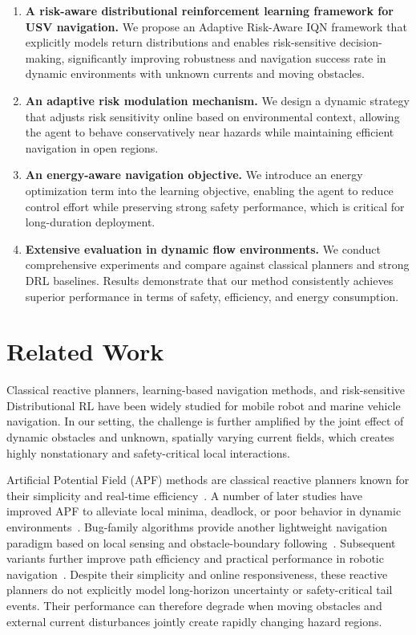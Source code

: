 \documentclass[runningheads]{llncs}
\begin{document}
\begin{enumerate}

\item \textbf{A risk-aware distributional reinforcement learning framework for USV navigation.}
We propose an Adaptive Risk-Aware IQN framework that explicitly models return distributions and enables risk-sensitive decision-making, significantly improving robustness and navigation success rate in dynamic environments with unknown currents and moving obstacles.

\item \textbf{An adaptive risk modulation mechanism.}
We design a dynamic strategy that adjusts risk sensitivity online based on environmental context, allowing the agent to behave conservatively near hazards while maintaining efficient navigation in open regions.

\item \textbf{An energy-aware navigation objective.}
We introduce an energy optimization term into the learning objective, enabling the agent to reduce control effort while preserving strong safety performance, which is critical for long-duration deployment.

\item \textbf{Extensive evaluation in dynamic flow environments.}
We conduct comprehensive experiments and compare against classical planners and strong DRL baselines. Results demonstrate that our method consistently achieves superior performance in terms of safety, efficiency, and energy consumption.

\end{enumerate}
\section{Related Work}
Classical reactive planners, learning-based navigation methods, and risk-sensitive Distributional RL have been widely studied for mobile robot and marine vehicle navigation. In our setting, the challenge is further amplified by the joint effect of dynamic obstacles and unknown, spatially varying current fields, which creates highly nonstationary and safety-critical local interactions.

Artificial Potential Field (APF) methods are classical reactive planners known for their simplicity and real-time efficiency~\cite{ref13}. A number of later studies have improved APF to alleviate local minima, deadlock, or poor behavior in dynamic environments~\cite{ref16,ref17}. Bug-family algorithms provide another lightweight navigation paradigm based on local sensing and obstacle-boundary following~\cite{ref22,ref23}. Subsequent variants further improve path efficiency and practical performance in robotic navigation~\cite{ref28,ref30}. Despite their simplicity and online responsiveness, these reactive planners do not explicitly model long-horizon uncertainty or safety-critical tail events. Their performance can therefore degrade when moving obstacles and external current disturbances jointly create rapidly changing hazard regions.
\end{document}
